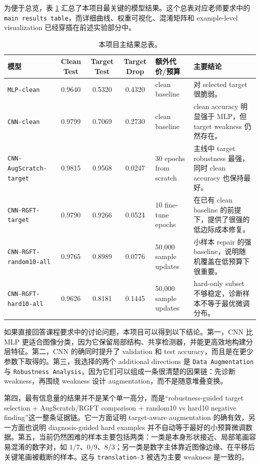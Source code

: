 \documentclass[12pt,a4paper,fontset=fandol]{ctexart}
\begin{document}
为便于总览，表 \ref{tab:main_results} 汇总了本项目最关键的模型结果。这个总表对应老师要求中的 \texttt{main results table}，而详细曲线、权重可视化、混淆矩阵和 example-level visualization 已经穿插在前述实验部分中。

\begin{table}[H]
  \centering
  \scriptsize
  \caption{本项目主结果总表。}
  \label{tab:main_results}
  \renewcommand{\arraystretch}{1.12}
  \setlength{\tabcolsep}{4pt}
  \begin{tabular}{lcccp{2.8cm}p{4.6cm}}
    \toprule
    模型 & Clean Test & Target Test & Target Drop & 额外代价/预算 & 主要结论 \\
    \midrule
    \texttt{MLP-clean} & 0.9640 & 0.5320 & 0.4320 & clean baseline & 对 selected target 很脆弱。 \\
    \texttt{CNN-clean} & 0.9799 & 0.7069 & 0.2730 & clean baseline & clean accuracy 明显强于 MLP，但 target weakness 仍然存在。 \\
    \texttt{CNN-AugScratch-target} & 0.9815 & 0.9568 & 0.0247 & 30 epochs from scratch & 主线中 target robustness 最强，同时 clean accuracy 也保持最好。 \\
    \texttt{CNN-RGFT-target} & 0.9790 & 0.9266 & 0.0524 & 10 fine-tune epochs & 在已有 clean baseline 的前提下，提供了很强的低边际成本修复。 \\
    \texttt{CNN-RGFT-random10-all} & 0.9765 & 0.8989 & 0.0776 & 50{,}000 sample updates & 小样本 repair 的强 baseline，说明随机覆盖在低预算下很重要。 \\
    \texttt{CNN-RGFT-hard10-all} & 0.9626 & 0.8181 & 0.1445 & 50{,}000 sample updates & hard-only subset 不够稳定，诊断样本不等于最优微调分布。 \\
    \bottomrule
  \end{tabular}
\end{table}

如果直接回答课程要求中的讨论问题，本项目可以得到以下结论。第一，CNN 比 MLP 更适合图像分类，因为它保留局部结构、共享检测器，并能更高效地构建分层特征。第二，CNN 的确同时提升了 validation 和 test accuracy，而且是在更少参数下取得的。第三，我选择的两个 additional directions 是 \texttt{Data Augmentation} 与 \texttt{Robustness Analysis}，因为它们可以组成一条很清楚的因果链：先诊断 weakness，再围绕 weakness 设计 augmentation，而不是随意堆叠变换。

第四，最有信息量的结果并不是某个单一高分，而是“robustness-guided target selection + AugScratch/RGFT comparison + random10 vs hard10 negative finding”这一整条证据链。它一方面证明 target-aware augmentation 的确有效，另一方面也说明 diagnosis-guided hard examples 并不自动等于最好的小预算微调数据。第五，当前仍然困难的样本主要包括两类：一类是本身形状接近、局部笔画容易混淆的数字对，如 $1/7$、$0/9$、$8/3$；另一类是数字主体靠近图像边缘、在平移后关键笔画被截断的样本。这与 \texttt{translation-3} 被选为主要 weakness 是一致的。
\end{document}
